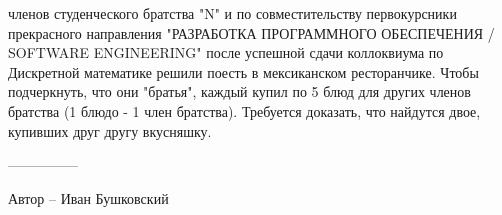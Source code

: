  членов студенческого братства "N" и по совместительству первокурсники прекрасного направления "РАЗРАБОТКА ПРОГРАММНОГО ОБЕСПЕЧЕНИЯ / SOFTWARE ENGINEERING" после успешной сдачи коллоквиума по Дискретной математике решили поесть в мексиканском ресторанчике. Чтобы подчеркнуть, что они "братья", каждый купил по 5 блюд для других членов братства (1 блюдо - 1 член братства). Требуется доказать, что найдутся двое, купивших друг другу вкусняшку.

---------------

Автор -- Иван Бушковский
